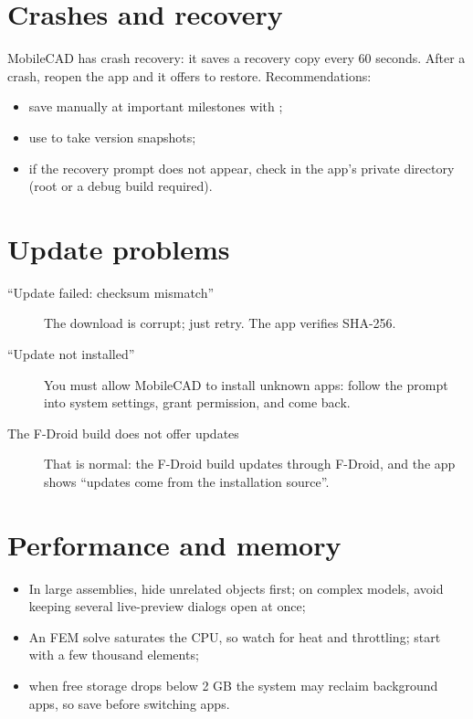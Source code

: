 \section{Crashes and recovery}

MobileCAD has crash recovery: it saves a recovery copy every 60 seconds. After a crash, reopen the app and it offers to restore. Recommendations:
\begin{itemize}
  \item save manually at important milestones with ;
  \item use  to take version snapshots;
  \item if the recovery prompt does not appear, check  in the app's private directory (root or a debug build required).
\end{itemize}

\section{Update problems}

\begin{description}
  \item[``Update failed: checksum mismatch''] The download is corrupt; just retry. The app verifies SHA-256.
  \item[``Update not installed''] You must allow MobileCAD to install unknown apps: follow the prompt into system settings, grant permission, and come back.
  \item[The F-Droid build does not offer updates] That is normal: the F-Droid build updates through F-Droid, and the app shows ``updates come from the installation source''.
\end{description}

\section{Performance and memory}

\begin{itemize}
  \item In large assemblies, hide unrelated objects first; on complex models, avoid keeping several live-preview dialogs open at once;
  \item An FEM solve saturates the CPU, so watch for heat and throttling; start with a few thousand elements;
  \item when free storage drops below 2 GB the system may reclaim background apps, so save before switching apps.
\end{itemize}

